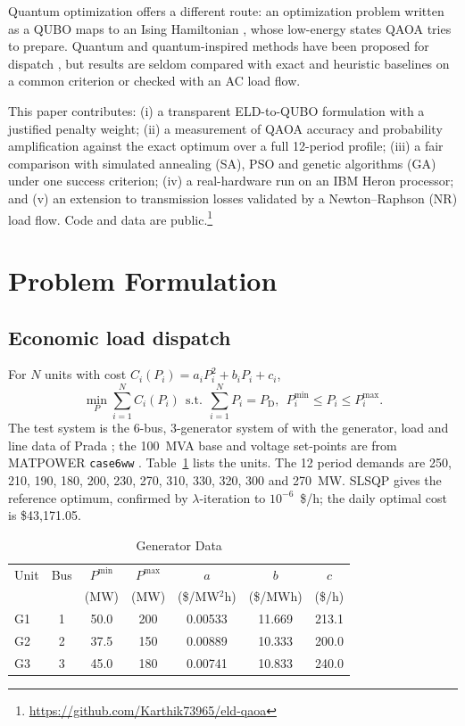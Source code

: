 \documentclass[conference]{IEEEtran}
\newcommand{\PD}{P_{\mathrm{D}}}
\begin{document}
Quantum optimization offers a different route: an optimization problem written as a QUBO maps to an Ising Hamiltonian \cite{lucas2014}, whose low-energy states QAOA \cite{farhi2014} tries to prepare. Quantum and quantum-inspired methods have been proposed for dispatch \cite{han2024,jing2023,wang2024}, but results are seldom compared with exact and heuristic baselines on a common criterion or checked with an AC load flow.

This paper contributes: (i) a transparent ELD-to-QUBO formulation with a justified penalty weight; (ii) a measurement of QAOA accuracy and probability amplification against the exact optimum over a full 12-period profile; (iii) a fair comparison with simulated annealing (SA), PSO and genetic algorithms (GA) under one success criterion; (iv) a real-hardware run on an IBM Heron processor; and (v) an extension to transmission losses validated by a Newton--Raphson (NR) load flow. Code and data are public.\footnote{\url{https://github.com/Karthik73965/eld-qaoa}}

\section{Problem Formulation}
\subsection{Economic load dispatch}
For $N$ units with cost $C_i(P_i) = a_iP_i^2 + b_iP_i + c_i$,
\begin{equation}
\min_{P} \sum_{i=1}^{N} C_i(P_i) \ \ \text{s.t.}\ \ \sum_{i=1}^{N} P_i = \PD,\ \ P_i^{\min} \le P_i \le P_i^{\max}.
\label{eq:eld}
\end{equation}
The test system is the 6-bus, 3-generator system of \cite{wood2014} with the generator, load and line data of Prada \cite[App.~D]{prada2017}; the 100~MVA base and voltage set-points are from MATPOWER \texttt{case6ww} \cite{matpower2011}. Table~\ref{tab:gen} lists the units. The 12 period demands are 250, 210, 190, 180, 200, 230, 270, 310, 330, 320, 300 and 270~MW. SLSQP \cite{kraft1988} gives the reference optimum, confirmed by $\lambda$-iteration to $10^{-6}$~\$/h; the daily optimal cost is \$43{,}171.05.

\begin{table}[t]
\centering
\caption{Generator Data \cite{prada2017}}
\label{tab:gen}
\setlength{\tabcolsep}{3.5pt}
\begin{tabular}{lcccccc}
\toprule
Unit & Bus & $P^{\min}$ & $P^{\max}$ & $a$ & $b$ & $c$\\
 & & (MW) & (MW) & (\$/MW$^2$h) & (\$/MWh) & (\$/h)\\
\midrule
G1 & 1 & 50.0 & 200 & 0.00533 & 11.669 & 213.1\\
G2 & 2 & 37.5 & 150 & 0.00889 & 10.333 & 200.0\\
G3 & 3 & 45.0 & 180 & 0.00741 & 10.833 & 240.0\\
\bottomrule
\end{tabular}
\end{table}
\end{document}
